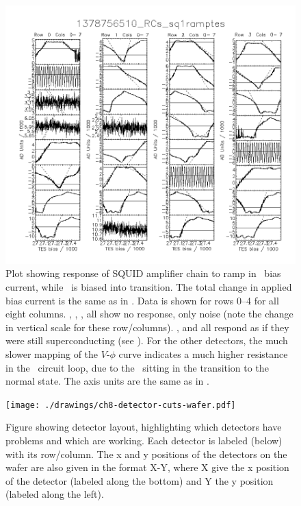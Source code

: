 \begin{figure}
\centering
\includegraphics[width=\textwidth]{./images/1378756510_RCs_sq1ramptes_00.png}
\caption{Plot showing response of SQUID amplifier chain to ramp in \TES\ bias current, while \TES\ is biased into transition.
  The total change in applied bias current is the same as in .
  Data is shown for rows 0--4 for all eight columns.
  , , ,  all show no response, only noise (note the change in vertical scale for these row/columns).
  ,  and  all respond as if they were still superconducting (see ).
  For the other detectors, the much slower mapping of the $V$-$\phi$ curve indicates a much higher resistance in the \TES\ circuit loop, due to the \TES\ sitting in the transition to the normal state.
  The axis units are the same as in .
}
\label{fig:tes-bias-ramp-trans}
\end{figure}

\begin{figure}
\centering
\texttt{[image: ./drawings/ch8-detector-cuts-wafer.pdf]}
\caption{
Figure showing detector layout, highlighting which detectors have problems and which are working.
Each detector is labeled (below) with its row/column.
The x and y positions of the detectors on the wafer are also given in the format X-Y, where X give the x position of the detector (labeled along the bottom) and Y the y position (labeled along the left).
}
\label{fig:detector-cuts-wafer}
\end{figure}

